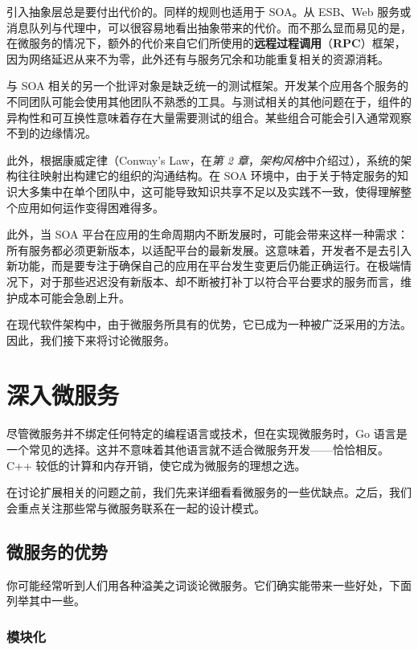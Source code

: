 \label{idx:1383}
\label{idx:1384}
引入抽象层总是要付出代价的。同样的规则也适用于 SOA。从 ESB、Web 服务或消息队列与代理中，可以很容易地看出抽象带来的代价。而不那么显而易见的是，在微服务的情况下，额外的代价来自它们所使用的\textbf{远程过程调用}（\textbf{RPC}）框架，因为网络延迟从来不为零，此外还有与服务冗余和功能重复相关的资源消耗。

与 SOA 相关的另一个批评对象是缺乏统一的测试框架。开发某个应用各个服务的不同团队可能会使用其他团队不熟悉的工具。与测试相关的其他问题在于，组件的异构性和可互换性意味着存在大量需要测试的组合。某些组合可能会引入通常观察不到的边缘情况。

此外，根据康威定律（Conway's Law，在\emph{第 2 章}，\emph{架构风格}中介绍过），系统的架构往往映射出构建它的组织的沟通结构。在 SOA 环境中，由于关于特定服务的知识大多集中在单个团队中，这可能导致知识共享不足以及实践不一致，使得理解整个应用如何运作变得困难得多。

此外，当 SOA 平台在应用的生命周期内不断发展时，可能会带来这样一种需求：所有服务都必须更新版本，以适配平台的最新发展。这意味着，开发者不是去引入新功能，而是要专注于确保自己的应用在平台发生变更后仍能正确运行。在极端情况下，对于那些迟迟没有新版本、却不断被打补丁以符合平台要求的服务而言，维护成本可能会急剧上升。

在现代软件架构中，由于微服务所具有的优势，它已成为一种被广泛采用的方法。因此，我们接下来将讨论微服务。

\section{深入微服务}

\label{idx:1385}
尽管微服务并不绑定任何特定的编程语言或技术，但在实现微服务时，Go 语言是一个常见的选择。这并不意味着其他语言就不适合微服务开发——恰恰相反。C++ 较低的计算和内存开销，使它成为微服务的理想之选。

在讨论扩展相关的问题之前，我们先来详细看看微服务的一些优缺点。之后，我们会重点关注那些常与微服务联系在一起的设计模式。

\subsection{微服务的优势}

\label{idx:1386}
你可能经常听到人们用各种溢美之词谈论微服务。它们确实能带来一些好处，下面列举其中一些。

\subsubsection{模块化}

